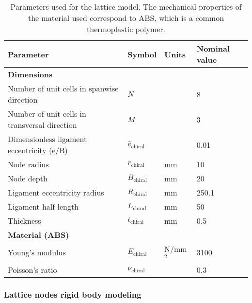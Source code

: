 \begin{table}[!htpb]
\centering
\begin{tabular}{|l|lll|}
\hline
\textbf{Parameter} & \multicolumn{1}{l|}{\textbf{Symbol}} & \multicolumn{1}{l|}{\textbf{Units}} & \textbf{Nominal value} \\ \hline \hline
{\textbf{Dimensions}} &  &  &  \\ \hline
Number of unit cells in spanwise direction & \multicolumn{1}{l|}{$N$} & \multicolumn{1}{l|}{} & 8 \\ \hline
Number of unit cells in transversal direction & \multicolumn{1}{l|}{$M$} & \multicolumn{1}{l|}{} & 3 \\ \hline
Dimensionless ligament eccentricity (e/B) & \multicolumn{1}{l|}{$\hat{e}_{\mathrm{chiral}}$} & \multicolumn{1}{l|}{} & 0.01 \\ \hline
Node radius & \multicolumn{1}{l|}{$r_{\mathrm{chiral}}$} & \multicolumn{1}{l|}{mm} & 10 \\ \hline
Node depth & \multicolumn{1}{l|}{$B_{\mathrm{chiral}}$} & \multicolumn{1}{l|}{mm} & 20 \\ \hline
Ligament eccentricity radius & \multicolumn{1}{l|}{$R_{\mathrm{chiral}}$} & \multicolumn{1}{l|}{mm} & 250.1 \\ \hline
Ligament half length & \multicolumn{1}{l|}{$L_{\mathrm{chiral}}$} & \multicolumn{1}{l|}{mm} & 50 \\ \hline
Thickness & \multicolumn{1}{l|}{$t_{\mathrm{chiral}}$} & \multicolumn{1}{l|}{mm} & 0.5 \\ \hline \hline
{\textbf{Material (ABS)}} &  &  &  \\ \hline
Young's modulus & \multicolumn{1}{l|}{$E_{\mathrm{chiral}}$} & \multicolumn{1}{l|}{N/mm$^2$} & 3100 \\ \hline
Poisson's ratio & \multicolumn{1}{l|}{$\nu_{\mathrm{chiral}}$} & \multicolumn{1}{l|}{} & 0.3 \\ \hline
\end{tabular}
\caption[Parameters used for the lattice model]{Parameters used for the lattice model. The mechanical properties of the material used correspond to ABS, which is a common thermoplastic polymer.}
\label{tab:parameters_lattice}
\end{table}

\clearpage
\subsubsection{Lattice nodes rigid body modeling} \label{subsubsec:latticeNodesRigid_Parametrization}


